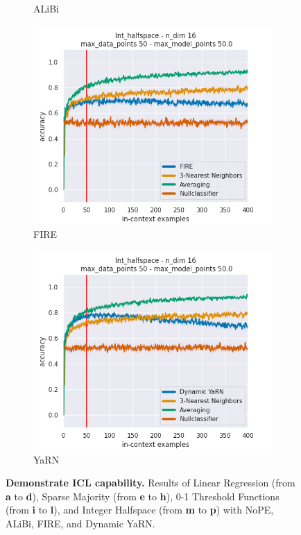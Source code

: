 \documentclass[letterpaper]{article} %
\begin{document}
\begin{figure}[tp]
\begin{subfigure}[t]{0.24\linewidth}
        \caption{ALiBi}
    \end{subfigure}
    \begin{subfigure}[t]{0.24\linewidth}
        \includegraphics[width=\linewidth]{AnonymousSubmission/LaTeX/imgs/experiments/halfspace/fire.png}
        \caption{FIRE}
    \end{subfigure}
    \begin{subfigure}[t]{0.24\linewidth}
        \includegraphics[width=\linewidth]{AnonymousSubmission/LaTeX/imgs/experiments/halfspace/dynamic-yarn.png}
        \caption{YaRN}
    \end{subfigure}
    \caption{\small\textbf{Demonstrate ICL capability.} Results of Linear Regression (from \textbf{a} to \textbf{d}), Sparse Majority (from \textbf{e} to \textbf{h}), 0-1 Threshold Functions (from \textbf{i} to \textbf{l}), and Integer Halfspace (from \textbf{m} to \textbf{p}) with NoPE, ALiBi, FIRE, and Dynamic YaRN.}
    \label{fig:icl}
\end{figure}
\end{document}
